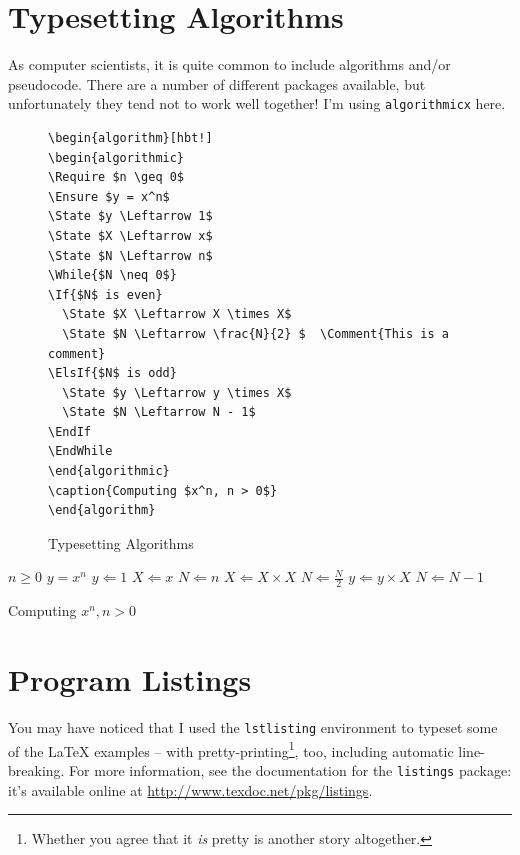 \section{Typesetting Algorithms}

As computer scientists, it is quite common to include algorithms and/or pseudocode. There are a number of different packages available, but unfortunately they tend not to work well together! I'm using \texttt{algorithmicx} here.

\begin{figure}[hbt!]
\begin{lstlisting}
\begin{algorithm}[hbt!]
\begin{algorithmic}
\Require $n \geq 0$
\Ensure $y = x^n$
\State $y \Leftarrow 1$
\State $X \Leftarrow x$
\State $N \Leftarrow n$
\While{$N \neq 0$}
\If{$N$ is even}
  \State $X \Leftarrow X \times X$
  \State $N \Leftarrow \frac{N}{2} $  \Comment{This is a comment}
\ElsIf{$N$ is odd}
  \State $y \Leftarrow y \times X$
  \State $N \Leftarrow N - 1$
\EndIf
\EndWhile
\end{algorithmic}
\caption{Computing $x^n, n > 0$}
\end{algorithm}
\end{lstlisting}
\caption{Typesetting Algorithms}\label{fig:lst:algo}
\end{figure}

\begin{algorithm}[hbt!]
\begin{algorithmic}
\Require $n \geq 0$
\Ensure $y = x^n$
\State $y \Leftarrow 1$
\State $X \Leftarrow x$
\State $N \Leftarrow n$
  \State $X \Leftarrow X \times X$
  \State $N \Leftarrow \frac{N}{2} $  
  \State $y \Leftarrow y \times X$
  \State $N \Leftarrow N - 1$
\EndIf
\EndWhile
\end{algorithmic}
\caption{Computing $x^n, n > 0$}
\end{algorithm}

\section{Program Listings}

You may have noticed that I used the \verb|lstlisting| environment to typeset some of the \LaTeX{} examples -- with pretty-printing\footnote{Whether you agree that it \emph{is} pretty is another story altogether.}, too, including automatic line-breaking.  For more information, see the documentation for the \verb|listings| package: it's available online at \url{http://www.texdoc.net/pkg/listings}.

